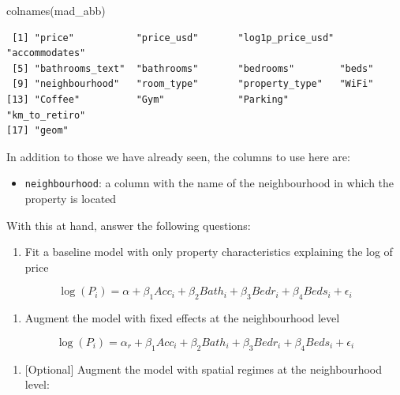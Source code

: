 \documentclass[
  letterpaper,
  DIV=11,
  numbers=noendperiod,
  oneside]{scrreprt}
\newenvironment{Shaded}{\begin{snugshade}}{\end{snugshade}}
\newcommand{\FunctionTok}[1]{\textcolor[rgb]{0.28,0.35,0.67}{#1}}
\newcommand{\NormalTok}[1]{\textcolor[rgb]{0.00,0.23,0.31}{#1}}
\providecommand{\tightlist}{%
  \setlength{\itemsep}{0pt}\setlength{\parskip}{0pt}}\usepackage{longtable,booktabs,array}
\begin{document}
\begin{Shaded}
\begin{Highlighting}[]
\FunctionTok{colnames}\NormalTok{(mad\_abb)}
\end{Highlighting}
\end{Shaded}

\begin{verbatim}
 [1] "price"           "price_usd"       "log1p_price_usd" "accommodates"   
 [5] "bathrooms_text"  "bathrooms"       "bedrooms"        "beds"           
 [9] "neighbourhood"   "room_type"       "property_type"   "WiFi"           
[13] "Coffee"          "Gym"             "Parking"         "km_to_retiro"   
[17] "geom"           
\end{verbatim}

In addition to those we have already seen, the columns to use here are:

\begin{itemize}
\tightlist
\item
  \texttt{neighbourhood}: a column with the name of the neighbourhood in
  which the property is located
\end{itemize}

With this at hand, answer the following questions:

\begin{enumerate}
\def\labelenumi{\arabic{enumi}.}
\tightlist
\item
  Fit a baseline model with only property characteristics explaining the
  log of price
\end{enumerate}

\[
\log(P_i) = \alpha + \beta_1 Acc_i + \beta_2 Bath_i + \beta_3 Bedr_i + \beta_4 Beds_i + \epsilon_i
\]

\begin{enumerate}
\def\labelenumi{\arabic{enumi}.}
\setcounter{enumi}{1}
\tightlist
\item
  Augment the model with fixed effects at the neighbourhood level
\end{enumerate}

\[
\log(P_i) = \alpha_r + \beta_1 Acc_i + \beta_2 Bath_i + \beta_3 Bedr_i + \beta_4 Beds_i + \epsilon_i
\]

\begin{enumerate}
\def\labelenumi{\arabic{enumi}.}
\setcounter{enumi}{2}
\tightlist
\item
  {[}Optional{]} Augment the model with spatial regimes at the
  neighbourhood level:
\end{enumerate}
\end{document}
